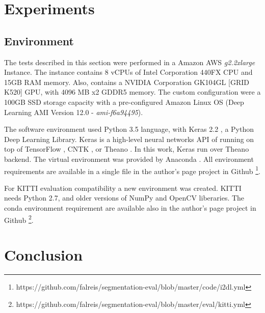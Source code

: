 \documentclass[10pt,twocolumn,letterpaper]{article}
\begin{document}
\section{Experiments} \label{sec:experiments}


\subsection{Environment} \label{ssec:environment}

The tests described in this section were performed in a Amazon AWS \cite{AMAZON_WEBSITE} \textit{g2.2xlarge} Instance. The instance contains 8 vCPUs of Intel Corporation 440FX CPU and 15GB RAM memory. Also, contains a NVIDIA Corporation GK104GL [GRID K520] GPU, with 4096 MB x2 GDDR5 memory. The custom configuration were a 100GB SSD storage capacity with a pre-configured Amazon Linux OS (Deep Learning AMI Version 12.0 - \textit{ami-f6a94495}).

The software environment used Python 3.5 \cite{PYTHON_WEBSITE} language, with Keras 2.2 \cite{KERAS}, a Python Deep Learning Library. Keras is a high-level neural networks API of running on top of TensorFlow \cite{TENSORFLOW}, CNTK \cite{CNTK}, or Theano \cite{THEANO} \cite{KERAS}. In this work, Keras run over Theano \cite{THEANO} backend. The virtual environment was provided by Anaconda \cite{ANACONDA_WEBSITE}. All environment requirements are available in a single file in the author's page project in Github \footnote{https://github.com/falreis/segmentation-eval/blob/master/code/i2dl.yml}.

For KITTI evaluation compatibility a new environment was created. KITTI needs Python 2.7, and older versions of NumPy and OpenCV liberaries. The conda environment requirement are available also in the author's page project in Github \footnote{https://github.com/falreis/segmentation-eval/blob/master/eval/kitti.yml}.

\section{Conclusion} \label{sec:conclusion}



{\small


}
\end{document}
